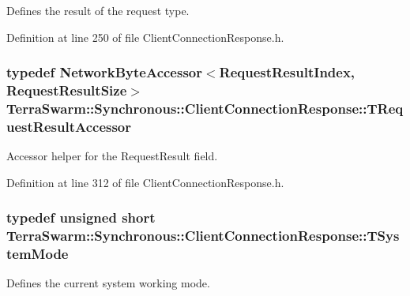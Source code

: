 Defines the result of the request type. 



Definition at line 250 of file Client\-Connection\-Response.\-h.

\hypertarget{class_terra_swarm_1_1_synchronous_1_1_client_connection_response_af1c0b39e843f05dcadd4e2b39c65bcee}{
\subsubsection[{T\-Request\-Result\-Accessor}]{\setlength{\rightskip}{0pt plus 5cm}typedef {\bf Network\-Byte\-Accessor}$<${\bf Request\-Result\-Index}, {\bf Request\-Result\-Size}$>$ {\bf Terra\-Swarm\-::\-Synchronous\-::\-Client\-Connection\-Response\-::\-T\-Request\-Result\-Accessor}\hspace{0.3cm}{\ttfamily [private]}}}\label{class_terra_swarm_1_1_synchronous_1_1_client_connection_response_af1c0b39e843f05dcadd4e2b39c65bcee}


Accessor helper for the Request\-Result field. 



Definition at line 312 of file Client\-Connection\-Response.\-h.

\hypertarget{class_terra_swarm_1_1_synchronous_1_1_client_connection_response_a828bc4f350b4f661c541d988c79f05e9}{
\subsubsection[{T\-System\-Mode}]{\setlength{\rightskip}{0pt plus 5cm}typedef unsigned short {\bf Terra\-Swarm\-::\-Synchronous\-::\-Client\-Connection\-Response\-::\-T\-System\-Mode}}}\label{class_terra_swarm_1_1_synchronous_1_1_client_connection_response_a828bc4f350b4f661c541d988c79f05e9}


Defines the current system working mode. 




